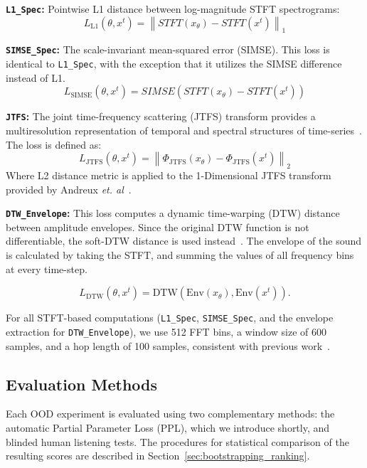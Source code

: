 \documentclass[10pt]{article} %
\newcommand{\SIMSESpec}{\texttt{SIMSE\_\allowbreak Spec}\xspace}
\newcommand{\LoneSpec}{\texttt{L1\_\allowbreak Spec}\xspace}
\newcommand{\JTFS}{\texttt{JTFS}\xspace}
\newcommand{\DTWEnv}{\texttt{DTW\_\allowbreak Envelope}\xspace}
\begin{document}
\medskip
\noindent\textbf{\LoneSpec:}
Pointwise L1 distance between log-magnitude STFT spectrograms:
\begin{equation}
    L_{\mathrm{L1}}(\theta, x^{t}) 
    = \left\| STFT (x_{\theta}) - STFT (x^{t}) \right\|_{1}
\end{equation}



\medskip
\noindent\textbf{\SIMSESpec:}
The scale-invariant mean-squared error (SIMSE). This loss is identical to \LoneSpec, with the exception that it utilizes the SIMSE difference instead of L1.
\begin{equation}
    L_{\mathrm{SIMSE}}(\theta, x^{t}) 
    =  SIMSE( STFT (x_{\theta}) - STFT (x^{t}))
\end{equation}

\medskip
\noindent\textbf{\JTFS:}
The joint time-frequency scattering (JTFS) transform provides a multiresolution representation of temporal and spectral structures of time-series~\cite{vahidi2023mesostructures,anden2015joint}. The loss is defined as:
\begin{equation}
    L_{\mathrm{JTFS}}(\theta, x^{t})
    = 
    \left\|
        \Phi_{\mathrm{JTFS}}(x_{\theta})
        -
        \Phi_{\mathrm{JTFS}}(x^{t})
    \right\|_{2}
\end{equation}
Where L2 distance metric is applied to the 1-Dimensional JTFS transform provided by Andreux \textit{et. al}~\cite{kymatio,salimi2025evaluating}.

\medskip
\noindent\textbf{\DTWEnv:}
This loss computes a dynamic time-warping (DTW) distance between amplitude envelopes. Since the original DTW function is not differentiable, the soft-DTW distance is used instead~\cite{softdtw_jax,cuturi2017soft}. The envelope of the sound is calculated by taking the STFT, and summing the values of all frequency bins at every time-step.

\begin{equation}
    L_{\mathrm{DTW}}(\theta, x^{t})
    =
    \mathrm{DTW}
    \left(
        \mathrm{Env}(x_{\theta}),
        \mathrm{Env}(x^{t})
    \right).
\end{equation}


For all STFT-based computations (\LoneSpec, \SIMSESpec, and the envelope extraction for \DTWEnv), we use 512 FFT bins, a window size of 600 samples, and a hop length of 100 samples, consistent with previous work~\cite{salimi2025evaluating}.


\subsection{Evaluation Methods}
\label{subsec:evaluation}
Each OOD experiment is evaluated using two complementary methods: the automatic Partial Parameter Loss (PPL), which we introduce shortly, and blinded human listening tests. The procedures for statistical comparison of the resulting scores are described in Section~\ref{sec:bootstrapping_ranking}.
\end{document}

